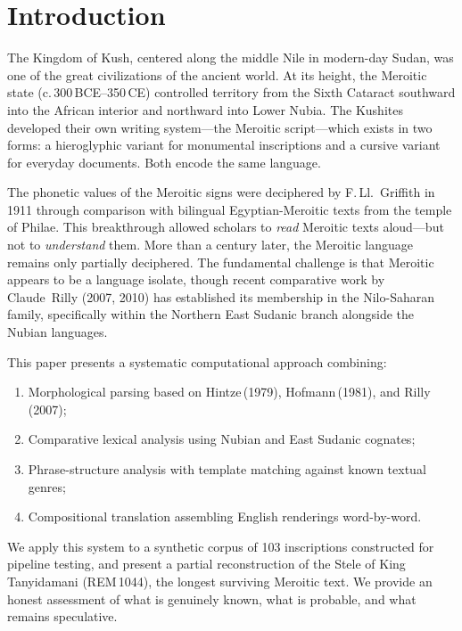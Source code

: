 \documentclass[11pt,a4paper]{article}
\begin{document}
\section{Introduction}

The Kingdom of Kush, centered along the middle Nile in modern-day Sudan, was
one of the great civilizations of the ancient world. At its height, the
Meroitic state (c.\,300\,BCE--350\,CE) controlled territory from the Sixth
Cataract southward into the African interior and northward into Lower Nubia.
The Kushites developed their own writing system---the Meroitic script---which
exists in two forms: a hieroglyphic variant for monumental inscriptions and a
cursive variant for everyday documents. Both encode the same language.

The phonetic values of the Meroitic signs were deciphered by F.\,Ll.~Griffith
in 1911 through comparison with bilingual Egyptian-Meroitic texts from the
temple of Philae. This breakthrough allowed scholars to \textit{read} Meroitic
texts aloud---but not to \textit{understand} them. More than a century later,
the Meroitic language remains only partially deciphered. The fundamental
challenge is that Meroitic appears to be a language isolate, though recent
comparative work by Claude~Rilly (2007, 2010) has established its membership
in the Nilo-Saharan family, specifically within the Northern East Sudanic
branch alongside the Nubian languages.

This paper presents a systematic computational approach combining:
\begin{enumerate}[nosep]
  \item Morphological parsing based on Hintze\,(1979), Hofmann\,(1981), and Rilly\,(2007);
  \item Comparative lexical analysis using Nubian and East Sudanic cognates;
  \item Phrase-structure analysis with template matching against known textual genres;
  \item Compositional translation assembling English renderings word-by-word.
\end{enumerate}

We apply this system to a synthetic corpus of 103 inscriptions constructed
for pipeline testing, and present a partial reconstruction of the Stele of
King Tanyidamani (REM\,1044), the longest surviving Meroitic text. We
provide an honest assessment of what is genuinely known, what is probable,
and what remains speculative.
\end{document}
